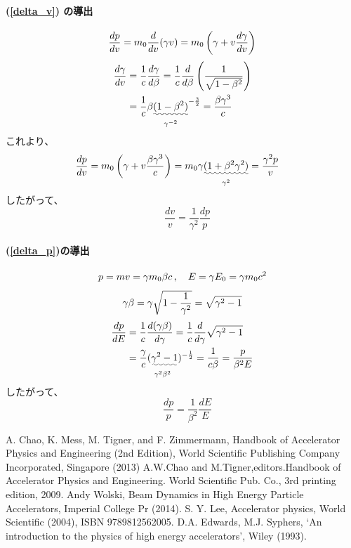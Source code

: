 \documentclass[10pt,a4paper]{ltjsarticle}
\begin{document}
\paragraph{(\ref{delta_v}) の導出}

\begin{equation}
  \frac{dp}{dv} = m_0\frac{d}{dv}(\gamma v)
  = m_0 \left(\gamma + v \frac{d\gamma}{dv}\right) \notag
\end{equation}
%
\begin{align}
  \frac{d\gamma}{dv} & = \frac{1}{c}\frac{d\gamma}{d\beta}= \frac{1}{c}\frac{d}{d\beta}\left(\frac{1}{\sqrt{1-\beta^2}}\right) \notag \\
  & = \frac{1}{c} \beta \underset{\gamma^{-2}}{\uwave{(1-\beta^2)}}^{-\frac{3}{2}} = \frac{\beta \gamma^3}{c} \notag
\end{align}
%
これより、
\begin{align}
  \frac{dp}{dv} & = m_0 \left(\gamma + v \frac{\beta \gamma^3}{c}\right)
  = m_0 \gamma \underset{\gamma^2}{\uwave{(1 + \beta^2 \gamma^2)}}
  = \frac{\gamma^2 p}{v} \notag
\end{align}
%
したがって、
%
\begin{equation}
  \quad \frac{dv}{v} = \frac{1}{\gamma^2}\frac{dp}{p}
  \label{dv_dp}
\end{equation}
%
\paragraph{(\ref{delta_p})の導出}
%
\begin{align}
  p = mv = \gamma m_0 \beta c\,  , \quad E = \gamma E_0 = \gamma m_0 c^2 \notag
\end{align}
%
\begin{equation}
  \gamma \beta = \gamma \sqrt{1-\frac{1}{\gamma^2}} \notag = \sqrt{\gamma^2 -1} \notag
\end{equation}
%
\begin{align}
  \frac{dp}{dE} & = \frac{1}{c}\frac{d(\gamma \beta)}{d\gamma} = \frac{1}{c}\frac{d}{d\gamma}\sqrt{\gamma^2 -1} \notag \\
  & = \frac{\gamma}{c} \underset{\gamma^2\beta^2}{(\uwave{\gamma^2 -1}})^{-\frac{1}{2}} = \frac{1}{c\beta}
  = \frac{p}{\beta^2 E}\notag
\end{align}
%
したがって、
%
\begin{equation}
  \quad \frac{dp}{p} = \frac{1}{\beta^2}\frac{dE}{E}
  \label{dp_de}
\end{equation}

%
\begin{thebibliography}{9}
  A. Chao, K. Mess, M. Tigner, and F. Zimmermann, Handbook of Accelerator Physics and Engineering (2nd Edition), World Scientific Publishing Company Incorporated, Singapore (2013)
  A.W.Chao and M.Tigner,editors.Handbook of Accelerator Physics and Engineering. World Scientific Pub. Co., 3rd printing edition, 2009.
  Andy Wolski, Beam Dynamics in High Energy Particle Accelerators,  Imperial College Pr (2014).
  S. Y. Lee, Accelerator physics, World Scientific (2004), ISBN 9789812562005.
  D.A. Edwards, M.J. Syphers, `An introduction to the physics of high energy accelerators', Wiley (1993).
\end{thebibliography}
%
\end{document}
